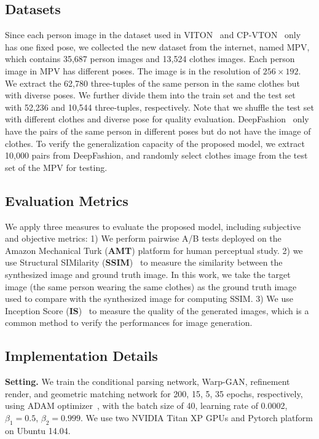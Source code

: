 \documentclass[10pt,twocolumn,letterpaper]{article}
\begin{document}
\subsection{Datasets}
Since each person image in the dataset used in VITON~\cite{han2017viton} and CP-VTON~\cite{wang2018cpvton} only has one fixed pose, we collected the new dataset from the internet, named MPV, which contains 35,687 person images and 13,524 clothes images. Each person image in MPV has different poses. The image is in the resolution of $256 \times 192$. We extract the 62,780 three-tuples of the same person in the same clothes but with diverse poses. We further divide them into the train set and the test set with 52,236 and 10,544 three-tuples, respectively. Note that we shuffle the test set with different clothes and diverse pose for quality evaluation. DeepFashion~\cite{liu2016deepfashion} only have the pairs of the same person in different poses but do not have the image of clothes. To verify the generalization capacity of the proposed model, we extract 10,000 pairs from DeepFashion, and randomly select clothes image from the test set of the MPV for testing.



\subsection{Evaluation Metrics}
We apply three measures to evaluate the proposed model, including subjective and objective metrics:
1) We perform pairwise A/B tests deployed on the Amazon Mechanical Turk (\textbf{AMT}) platform for human perceptual study. 2) we use Structural SIMilarity (\textbf{SSIM})~\cite{wang2004image} to measure the similarity between the synthesized image and ground truth image. In this work, we take the target image (the same person wearing the same clothes) as the ground truth image used to compare with the synthesized image for computing SSIM. 3) We use Inception Score (\textbf{IS})~\cite{NIPS2016_6125} to measure the quality of the generated images, which is a common method to verify the performances for image generation.
 
\subsection{Implementation Details}
\textbf{Setting.}
We train the conditional parsing network, Warp-GAN, refinement render, and geometric matching network for 200, 15, 5, 35 epochs, respectively, using ADAM optimizer~\cite{Diederik2014Adam}, with the batch size of 40, learning rate of 0.0002, $\beta_1 = 0.5$, $\beta_2 = 0.999$. We use two NVIDIA Titan XP GPUs and Pytorch platform on Ubuntu 14.04.
\end{document}
